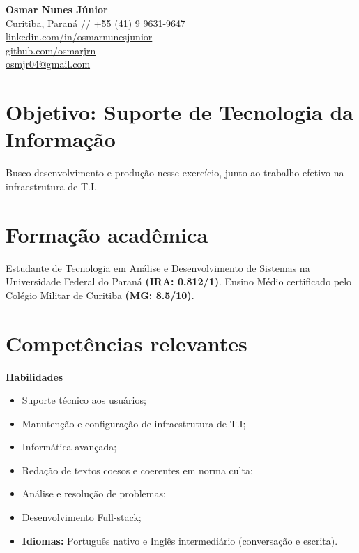 \documentclass[a4paper,11pt]{article}
\begin{document}
\begin{center}
    {\LARGE \textbf{Osmar Nunes Júnior}} \\ \vspace{0.2cm}
    Curitiba, Paraná // +55 (41) 9 9631-9647 \\
    \href{https://www.linkedin.com/in/osmarnunesjunior}{linkedin.com/in/osmarnunesjunior} \\
    \href{https://www.github.com/osmarjrn}{github.com/osmarjrn} \\
    \href{mailto:osmjr04@gmail.com}{osmjr04@gmail.com}
\end{center}

\vspace{0.5cm}

\section*{Objetivo: Suporte de Tecnologia da Informação}
Busco desenvolvimento e produção nesse exercício, junto ao trabalho efetivo na infraestrutura de T.I.

\section*{Formação acadêmica}
Estudante de Tecnologia em Análise e Desenvolvimento de Sistemas na Universidade Federal do Paraná \textbf{(IRA: 0.812/1)}. Ensino Médio certificado pelo Colégio Militar de Curitiba \textbf{(MG: 8.5/10)}.

\section*{Competências relevantes}

\vspace{0.3cm}

\textbf{Habilidades}
\begin{itemize}[noitemsep, label={--}]
    \item Suporte técnico aos usuários;
    \item Manutenção e configuração de infraestrutura de T.I;
    \item Informática avançada;
    \item Redação de textos coesos e coerentes em norma culta;
    \item Análise e resolução de problemas;
    \item Desenvolvimento Full-stack;
    \item \textbf{Idiomas:} Português nativo e Inglês intermediário (conversação e escrita).
\end{itemize}
\end{document}
